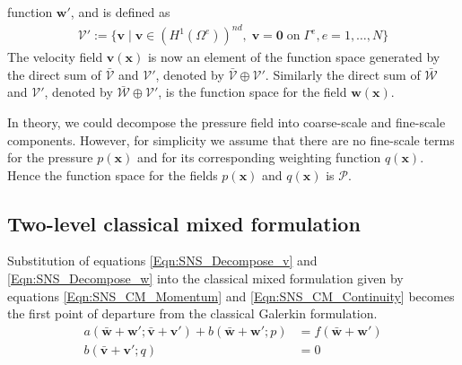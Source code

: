 \documentclass[11pt]{amsart}
\begin{document}
function $\boldsymbol{w}'$, and is defined as 
\begin{align}
  \label{Eqn:SNS_function_space_for_v_prime}
  \mathcal{V}' := \{\boldsymbol{v} \; \bigr| \; \boldsymbol{v} 
  \in (H^{1}(\Omega^e))^{nd} , \; \boldsymbol{v} = \boldsymbol{0} \; \mbox{on} \; 
  \Gamma^e, e = 1, \ldots, N \} 
\end{align}
The velocity field $\boldsymbol{v}(\boldsymbol{x})$ is now an element of the function 
space generated by the direct sum of $\bar{\mathcal{V}}$ and $\mathcal{V}'$, denoted 
by $\bar{\mathcal{V}} \oplus \mathcal{V}'$. Similarly the direct sum of $\bar{\mathcal{W}}$ 
and $\mathcal{V}{'}$, denoted by $\bar{\mathcal{W}}\oplus\mathcal{V}'$, is the function 
space for the field $\boldsymbol{w}(\boldsymbol{x})$. 

In theory, we could decompose the pressure field into coarse-scale and fine-scale 
components. However, for simplicity we assume that there are no fine-scale terms 
for the pressure $p(\boldsymbol{x})$ and for its corresponding weighting function 
$q(\boldsymbol{x})$. Hence the function space for the fields $p(\boldsymbol{x})$ 
and $q(\boldsymbol{x})$ is $\mathcal{P}$.
\subsection{Two-level classical mixed formulation}
Substitution of equations \eqref{Eqn:SNS_Decompose_v} and \eqref{Eqn:SNS_Decompose_w} 
into the classical mixed formulation given by equations \eqref{Eqn:SNS_CM_Momentum} and 
\eqref{Eqn:SNS_CM_Continuity} becomes the first point of departure from the 
classical Galerkin formulation. 
\begin{align}
  \label{Eqn:SNS_Multiscale_Momentum}
  a(\bar{\boldsymbol{w}} + \boldsymbol{w}';\bar{\boldsymbol{v}} + \boldsymbol{v}') + 
  b(\bar{\boldsymbol{w}} + \boldsymbol{w}';p) 
  &= f(\bar{\boldsymbol{w}} + \boldsymbol{w}')  \\
\label{Eqn:SNS_Multiscale_Continuity}
  b(\bar{\boldsymbol{v}} + \boldsymbol{v}';q) &= 0 
\end{align}
\end{document}
